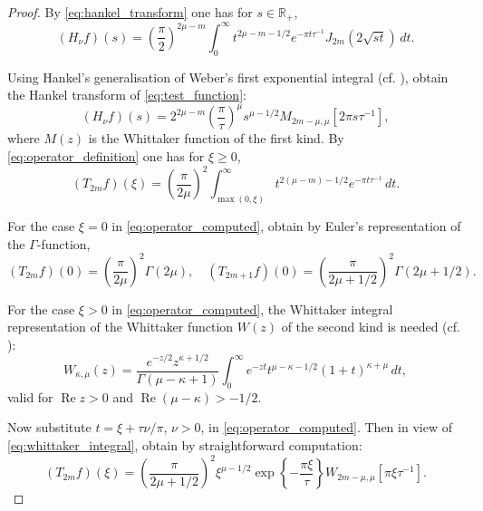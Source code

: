 \documentclass[11pt]{article}
\theoremstyle{plain}
\begin{document}
\begin{proof}
By \eqref{eq:hankel_transform} one has for $s \in \mathbb{R}_+$,
\begin{equation}
(H_\nu f)(s) = \left(\frac{\pi}{2}\right)^{2\mu-m} \int_0^\infty t^{2\mu-m-1/2} e^{-\pi t \tau^{-1}} J_{2m}(2\sqrt{st}) \, dt.
\label{eq:hankel_computed}
\end{equation}

Using Hankel's generalisation of Weber's first exponential integral (cf. \cite{31}), obtain the Hankel transform of \eqref{eq:test_function}:
\begin{equation}
(H_\nu f)(s) = 2^{2\mu-m} \left(\frac{\pi}{\tau}\right)^{\mu} s^{\mu-1/2} M_{2m-\mu, \mu}[2\pi s \tau^{-1}],
\label{eq:hankel_whittaker}
\end{equation}
where $M(z)$ is the Whittaker function of the first kind. By \eqref{eq:operator_definition} one has for $\xi \geq 0$,
\begin{equation}
(T_{2m} f)(\xi) = \left(\frac{\pi}{2\mu}\right)^2 \int_{\max(0, \xi)}^\infty t^{2(\mu-m)-1/2} e^{-\pi t \tau^{-1}} \, dt.
\label{eq:operator_computed}
\end{equation}

For the case $\xi = 0$ in \eqref{eq:operator_computed}, obtain by Euler's representation of the $\Gamma$-function,
\begin{equation}
(T_{2m} f)(0) = \left(\frac{\pi}{2\mu}\right)^2 \Gamma(2\mu), \quad (T_{2m+1} f)(0) = \left(\frac{\pi}{2\mu + 1/2}\right)^2 \Gamma(2\mu + 1/2).
\label{eq:operator_zero}
\end{equation}

For the case $\xi > 0$ in \eqref{eq:operator_computed}, the Whittaker integral representation of the Whittaker function $W(z)$ of the second kind is needed (cf. \cite{33}):
\begin{equation}
W_{\kappa, \mu}(z) = \frac{e^{-z/2} z^{\kappa + 1/2}}{\Gamma(\mu - \kappa + 1)} \int_0^\infty e^{-zt} t^{\mu - \kappa - 1/2} (1 + t)^{\kappa + \mu} \, dt,
\label{eq:whittaker_integral}
\end{equation}
valid for $\operatorname{Re} z > 0$ and $\operatorname{Re}(\mu - \kappa) > -1/2$.

Now substitute $t = \xi + \tau \nu / \pi$, $\nu > 0$, in \eqref{eq:operator_computed}. Then in view of \eqref{eq:whittaker_integral}, obtain by straightforward computation:
\begin{equation}
(T_{2m} f)(\xi) = \left(\frac{\pi}{2\mu + 1/2}\right)^2 \xi^{\mu-1/2} \exp\left\{-\frac{\pi \xi}{\tau}\right\} W_{2m-\mu, \mu}[\pi \xi \tau^{-1}].
\label{eq:operator_xi}
\end{equation}


\end{proof}
\end{document}
